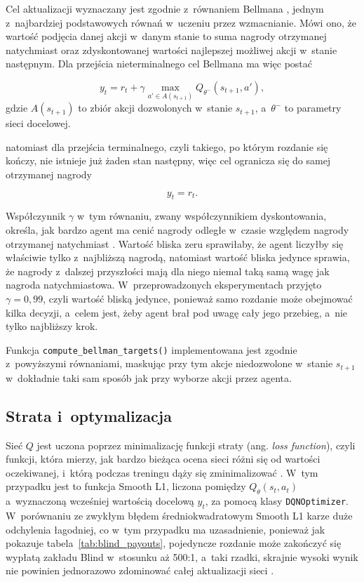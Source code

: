 Cel aktualizacji wyznaczany jest zgodnie z~równaniem Bellmana
\cite{bellman_equation_pykes}, jednym z~najbardziej podstawowych równań
w~uczeniu przez wzmacnianie. Mówi ono, że wartość podjęcia danej akcji
w~danym stanie to suma nagrody otrzymanej natychmiast oraz zdyskontowanej
wartości najlepszej możliwej akcji w~stanie następnym. Dla przejścia
nieterminalnego cel Bellmana ma więc postać

\begin{equation}
    y_t =
    r_t +
    \gamma
    \max_{a' \in A(s_{t+1})}
    Q_{\theta^-}(s_{t+1},a'),
\end{equation}
gdzie $A(s_{t+1})$ to zbiór akcji dozwolonych w~stanie $s_{t+1}$, a~$\theta^-$ to parametry sieci docelowej.

natomiast dla przejścia terminalnego, czyli takiego, po którym rozdanie
się kończy, nie istnieje już żaden stan następny, więc cel ogranicza się
do samej otrzymanej nagrody

\begin{equation}
    y_t = r_t.
\end{equation}

Współczynnik $\gamma$ w~tym równaniu, zwany współczynnikiem dyskontowania,
określa, jak bardzo agent ma cenić nagrody odległe w~czasie względem
nagrody otrzymanej natychmiast \cite{discount_factor_gamma,gamma_factor}. Wartość
bliska zeru sprawiłaby, że agent liczyłby się właściwie tylko z~najbliższą
nagrodą, natomiast wartość bliska jedynce sprawia, że nagrody z~dalszej
przyszłości mają dla niego niemal taką samą wagę jak nagroda natychmiastowa.
W~przeprowadzonych eksperymentach przyjęto $\gamma = 0{,}99$, czyli wartość bliską
jedynce, ponieważ samo rozdanie może obejmować kilka decyzji, a~celem jest,
żeby agent brał pod uwagę cały jego przebieg, a~nie tylko
najbliższy krok.

Funkcja \texttt{compute\_bellman\_targets()} implementowana jest zgodnie
z~powyższymi równaniami, maskując przy tym akcje niedozwolone w~stanie
$s_{t+1}$ w~dokładnie taki sam sposób jak przy wyborze akcji przez
agenta.

\subsection{Strata i~optymalizacja}

Sieć $Q$ jest uczona poprzez minimalizację funkcji straty (ang. \emph{loss
function}), czyli funkcji, która mierzy,
jak bardzo bieżąca ocena sieci różni się od wartości oczekiwanej,
i~którą podczas treningu dąży się zminimalizować \cite{loss_function_datacamp}. W~tym przypadku
jest to funkcja Smooth L1, liczona pomiędzy $Q_\theta(s_t,a_t)$
a~wyznaczoną wcześniej wartością docelową $y_t$, za pomocą klasy
\texttt{DQNOptimizer}. W~porównaniu ze zwykłym błędem
średniokwadratowym Smooth L1 karze duże odchylenia łagodniej, co w~tym przypadku ma uzasadnienie, ponieważ jak pokazuje
tabela~\ref{tab:blind_payouts}, pojedyncze rozdanie może zakończyć się
wypłatą zakładu Blind w~stosunku aż 500:1, a~taki rzadki, skrajnie
wysoki wynik nie powinien jednorazowo zdominować całej aktualizacji
sieci \cite{huber_1964,huber_loss_geeksforgeeks}.

